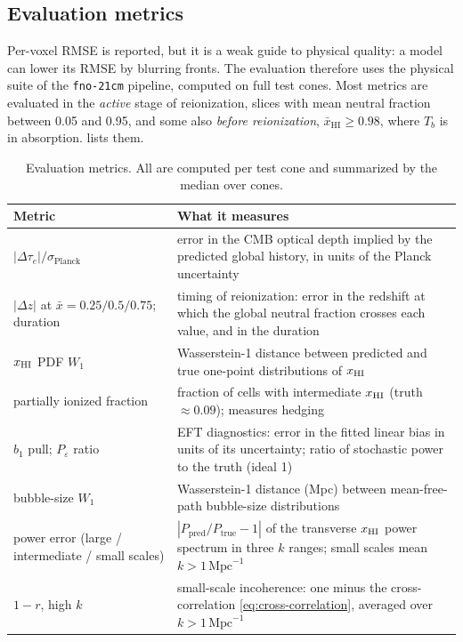 \subsection{Evaluation metrics}
\label{sec:metrics}

Per-voxel RMSE is reported, but it is a weak guide to physical quality: a model can lower its RMSE by blurring fronts. The evaluation therefore uses the physical suite of the \texttt{fno-21cm} pipeline, computed on full test cones. Most metrics are evaluated in the \emph{active} stage of reionization, slices with mean neutral fraction between 0.05 and 0.95, and some also \emph{before reionization}, $\bar x_{\mathrm{HI}}\ge0.98$, where $T_b$ is in absorption.  lists them.

\begin{table}[!tp]
  \centering
  \caption{Evaluation metrics. All are computed per test cone and summarized by the median over cones.}
  \label{tab:metrics}
  \small
  \begin{tabular}{@{}p{4.3cm}p{9.6cm}@{}}
    \toprule
    Metric & What it measures \\
    \midrule
    $|\Delta\tau_e|/\sigma_{\mathrm{Planck}}$ & error in the CMB optical depth implied by the predicted global history, in units of the Planck uncertainty \\
    $|\Delta z|$ at $\bar x=0.25/0.5/0.75$; duration & timing of reionization: error in the redshift at which the global neutral fraction crosses each value, and in the duration \\
    $x_{\mathrm{HI}}$ PDF $W_1$ & Wasserstein-1 distance between predicted and true one-point distributions of $x_{\mathrm{HI}}$ \\
    partially ionized fraction & fraction of cells with intermediate $x_{\mathrm{HI}}$ (truth $\approx0.09$); measures hedging \\
    $b_1$ pull; $P_\varepsilon$ ratio & EFT diagnostics: error in the fitted linear bias in units of its uncertainty; ratio of stochastic power to the truth (ideal 1) \\
    bubble-size $W_1$ & Wasserstein-1 distance (Mpc) between mean-free-path bubble-size distributions \\
    power error (large / intermediate / small scales) & $|P_{\mathrm{pred}}/P_{\mathrm{true}}-1|$ of the transverse $x_{\mathrm{HI}}$ power spectrum in three $k$ ranges; small scales mean $k>1\,\mathrm{Mpc}^{-1}$ \\
    $1-r$, high $k$ & small-scale incoherence: one minus the cross-correlation \cref{eq:cross-correlation}, averaged over $k>1\,\mathrm{Mpc}^{-1}$ \\

\end{tabular}
\end{table}
